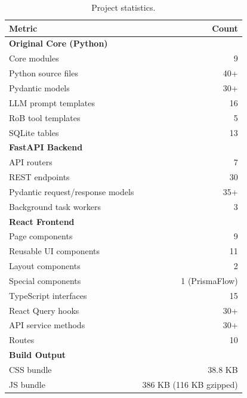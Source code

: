 \documentclass[11pt,a4paper]{article}
\begin{document}
\begin{table}[H]
\centering
\begin{tabular}{lr}
\toprule
\textbf{Metric} & \textbf{Count} \\
\midrule
\multicolumn{2}{l}{\textbf{Original Core (Python)}} \\
Core modules & 9 \\
Python source files & 40+ \\
Pydantic models & 30+ \\
LLM prompt templates & 16 \\
RoB tool templates & 5 \\
SQLite tables & 13 \\
\midrule
\multicolumn{2}{l}{\textbf{FastAPI Backend}} \\
API routers & 7 \\
REST endpoints & 30 \\
Pydantic request/response models & 35+ \\
Background task workers & 3 \\
\midrule
\multicolumn{2}{l}{\textbf{React Frontend}} \\
Page components & 9 \\
Reusable UI components & 11 \\
Layout components & 2 \\
Special components & 1 (PrismaFlow) \\
TypeScript interfaces & 15 \\
React Query hooks & 30+ \\
API service methods & 30+ \\
Routes & 10 \\
\midrule
\multicolumn{2}{l}{\textbf{Build Output}} \\
CSS bundle & 38.8 KB \\
JS bundle & 386 KB (116 KB gzipped) \\
\bottomrule
\end{tabular}
\caption{Project statistics.}
\end{table}
\end{document}
